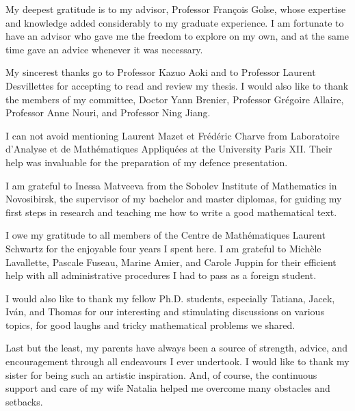 My deepest gratitude is to my advisor, Professor François Golse, whose expertise and knowledge added considerably to my graduate experience. I am fortunate to have an advisor who gave me the freedom to explore on my own, and at the same time gave an advice whenever it was necessary.

My sincerest thanks go to Professor Kazuo Aoki and to Professor Laurent Desvillettes for accepting to read and review my thesis. I would also like to thank the members of my committee, Doctor Yann Brenier, Professor Grégoire Allaire, Professor Anne Nouri, and Professor Ning Jiang. 

I can not avoid mentioning Laurent Mazet et Frédéric Charve from  Laboratoire d'Analyse et de Mathématiques Appliquées at the University Paris XII. Their help was invaluable for the preparation of my defence presentation.

I am grateful to Inessa Matveeva from the Sobolev Institute of Mathematics in Novosibirsk, the supervisor of my bachelor and master diplomas, for guiding  my first steps in research and teaching me how to write a good mathematical text.

I owe my gratitude to all members of the Centre de Mathématiques Laurent Schwartz for the enjoyable four years I spent here. I am grateful to Michèle Lavallette, Pascale Fuseau, Marine Amier, and Carole Juppin for their efficient help with all administrative procedures I had to pass as a foreign student.

I would also like to thank my fellow Ph.D. students, especially Tatiana, Jacek, Iván, and Thomas for our interesting and stimulating discussions on various topics, for good laughs and tricky mathematical problems we shared.

Last but the least, my parents have always been a source of strength, advice, and encouragement through all endeavours I ever undertook. I would like to thank my sister for being such an artistic inspiration. And, of course, the continuous support and care of my wife Natalia helped me overcome many obstacles and setbacks.
